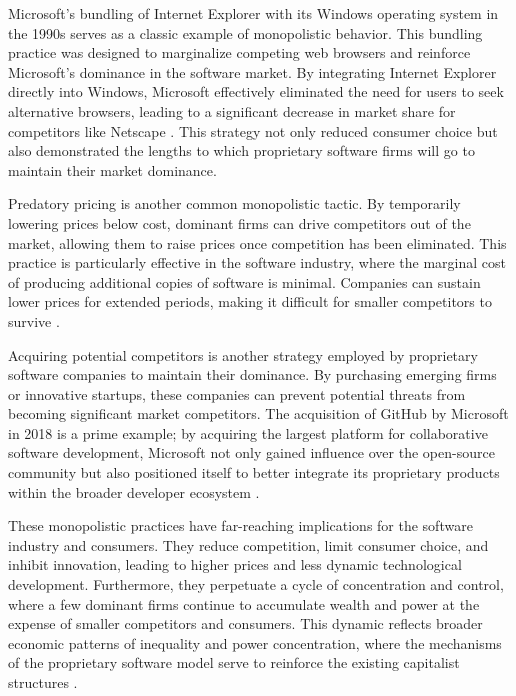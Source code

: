 \begin{refsection}
Microsoft’s bundling of Internet Explorer with its Windows operating system in the 1990s serves as a classic example of monopolistic behavior. This bundling practice was designed to marginalize competing web browsers and reinforce Microsoft’s dominance in the software market. By integrating Internet Explorer directly into Windows, Microsoft effectively eliminated the need for users to seek alternative browsers, leading to a significant decrease in market share for competitors like Netscape \cite[pp.~115-120]{schiller2000}. This strategy not only reduced consumer choice but also demonstrated the lengths to which proprietary software firms will go to maintain their market dominance.

Predatory pricing is another common monopolistic tactic. By temporarily lowering prices below cost, dominant firms can drive competitors out of the market, allowing them to raise prices once competition has been eliminated. This practice is particularly effective in the software industry, where the marginal cost of producing additional copies of software is minimal. Companies can sustain lower prices for extended periods, making it difficult for smaller competitors to survive \cite[pp.~112-117]{schiller2000}.

Acquiring potential competitors is another strategy employed by proprietary software companies to maintain their dominance. By purchasing emerging firms or innovative startups, these companies can prevent potential threats from becoming significant market competitors. The acquisition of GitHub by Microsoft in 2018 is a prime example; by acquiring the largest platform for collaborative software development, Microsoft not only gained influence over the open-source community but also positioned itself to better integrate its proprietary products within the broader developer ecosystem \cite[pp.~200-205]{moody2002}.

These monopolistic practices have far-reaching implications for the software industry and consumers. They reduce competition, limit consumer choice, and inhibit innovation, leading to higher prices and less dynamic technological development. Furthermore, they perpetuate a cycle of concentration and control, where a few dominant firms continue to accumulate wealth and power at the expense of smaller competitors and consumers. This dynamic reflects broader economic patterns of inequality and power concentration, where the mechanisms of the proprietary software model serve to reinforce the existing capitalist structures \cite[pp.~1-25]{marx2008}.


\end{refsection}
